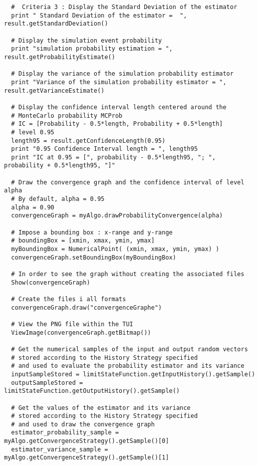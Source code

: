 \begin{lstlisting}
  #  Criteria 3 : Display the Standard Deviation of the estimator
  print " Standard Deviation of the estimator =  ", result.getStandardDeviation()

  # Display the simulation event probability
  print "simulation probability estimation = ", result.getProbabilityEstimate()

  # Display the variance of the simulation probability estimator
  print "Variance of the simulation probability estimator = ", result.getVarianceEstimate()

  # Display the confidence interval length centered around the
  # MonteCarlo probability MCProb
  # IC = [Probability - 0.5*length, Probability + 0.5*length]
  # level 0.95
  length95 = result.getConfidenceLength(0.95)
  print "0.95 Confidence Interval length = ", length95
  print "IC at 0.95 = [", probability - 0.5*length95, "; ", probability + 0.5*length95, "]"

  # Draw the convergence graph and the confidence interval of level alpha
  # By default, alpha = 0.95
  alpha = 0.90
  convergenceGraph = myAlgo.drawProbabilityConvergence(alpha)

  # Impose a bounding box : x-range and y-range
  # boundingBox = [xmin, xmax, ymin, ymax]
  myBoundingBox = NumericalPoint( (xmin, xmax, ymin, ymax) )
  convergenceGraph.setBoundingBox(myBoundingBox)

  # In order to see the graph without creating the associated files
  Show(convergenceGraph)

  # Create the files i all formats
  convergenceGraph.draw("convergenceGraphe")

  # View the PNG file within the TUI
  ViewImage(convergenceGraph.getBitmap())

  # Get the numerical samples of the input and output random vectors
  # stored according to the History Strategy specified
  # and used to evaluate the probability estimator and its variance
  inputSampleStored = limitStateFunction.getInputHistory().getSample()
  outputSampleStored = limitStateFunction.getOutputHistory().getSample()

  # Get the values of the estimator and its variance
  # stored according to the History Strategy specified
  # and used to draw the convergence graph
  estimator_probability_sample = myAlgo.getConvergenceStrategy().getSample()[0]
  estimator_variance_sample = myAlgo.getConvergenceStrategy().getSample()[1]
\end{lstlisting}
